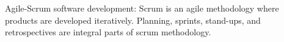 \label{sec:process-model}
Agile-Scrum software development:  Scrum is an agile methodology where products are developed iteratively. Planning, sprints, stand-ups, and retrospectives are integral parts of scrum methodology.